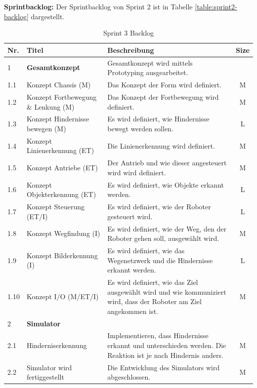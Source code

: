 \textbf{Sprintbacklog:} Der Sprintbacklog von Sprint 2 ist in Tabelle \ref{table:sprint2-backlog} dargestellt.

\begin{table}[H]
\centering
\small
\begin{tabularx}{\textwidth}{|l|l|X|c|}
\hline
  \textbf{Nr.} & \textbf{Titel} & \textbf{Beschreibung} & \textbf{Size}\\
  \hline
  1  & \textbf{Gesamtkonzept} & Gesamtkonzept wird mittels Prototyping ausgearbeitet.&\\
  \hline
  1.1  & Konzept Chassis (M) &  Das Konzept der Form wird definiert. & M\\
  \hline
  1.2  & Konzept Fortbewegung \& Lenkung (M) &  Das Konzept der Fortbewegung wird definiert. & M\\
  \hline
  1.3 & Konzept Hindernisse bewegen (M) & Es wird definiert, wie Hindernisse bewegt werden sollen. & L\\
  \hline
  1.4 & Konzept Linienerkennung (ET) & Die Linienerkennung wird definiert. & M\\
  \hline
  1.5 & Konzept Antriebe (ET) & Der Antrieb und wie dieser angesteuert wird wird definiert. & M\\
  \hline
  1.6 & Konzept Objekterkennung (ET) & Es wird definiert, wie Objekte erkannt werden. & L\\
  \hline
  1.7 & Konzept Steuerung (ET/I) & Es wird definiert, wie der Roboter gesteuert wird. & L\\
  \hline
    1.8 & Konzept Wegfindung (I) & Es wird definiert, wie der Weg, den der Roboter gehen soll, ausgewählt wird.  & M\\
\hline
    1.9 & Konzept Bilderkennung (I) & Es wird definiert, wie das Wegenetzwerk und die Hindernisse erkannt werden. & L\\
\hline
    1.10 & Konzept I/O (M/ET/I) & Es wird definiert, wie das Ziel ausgewählt wird und wie kommuniziert wird, dass der Roboter am Ziel angekommen ist. & M\\
\hline

  2  & \textbf{Simulator} &&\\
  \hline
    2.1 & Hinderniserkennung & Implementieren, dass Hindernisse erkannt und unterschieden werden. Die Reaktion ist je nach Hindernis anders.& M \\
    \hline
  2.2 & Simulator wird fertiggestellt &  Die Entwicklung des Simulators wird abgeschlossen. & M\\
  \hline
  
\end{tabularx}
\caption{Sprint 3 Backlog}
\label{table:sprint3-backlog}
\end{table}

